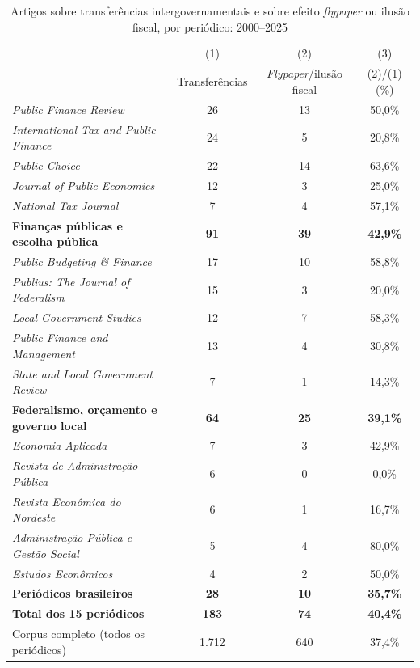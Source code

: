 \begin{table}[htbp]
\centering
\caption{Artigos sobre transferências intergovernamentais e sobre efeito \textit{flypaper} ou ilusão fiscal, por periódico: 2000--2025}
\label{tab:baker}
\small
\begin{tabular}{lccc}
\toprule
 & (1) & (2) & (3)\\
 & Transferências & \textit{Flypaper}/ilusão fiscal & (2)/(1) (\%)\\
\midrule
\textit{Public Finance Review} & 26 & 13 & 50,0\%\\
\textit{International Tax and Public Finance} & 24 & 5 & 20,8\%\\
\textit{Public Choice} & 22 & 14 & 63,6\%\\
\textit{Journal of Public Economics} & 12 & 3 & 25,0\%\\
\textit{National Tax Journal} & 7 & 4 & 57,1\%\\
\textbf{Finanças públicas e escolha pública} & \textbf{91} & \textbf{39} & \textbf{42,9\%}\\
\midrule
\textit{Public Budgeting \& Finance} & 17 & 10 & 58,8\%\\
\textit{Publius: The Journal of Federalism} & 15 & 3 & 20,0\%\\
\textit{Local Government Studies} & 12 & 7 & 58,3\%\\
\textit{Public Finance and Management} & 13 & 4 & 30,8\%\\
\textit{State and Local Government Review} & 7 & 1 & 14,3\%\\
\textbf{Federalismo, orçamento e governo local} & \textbf{64} & \textbf{25} & \textbf{39,1\%}\\
\midrule
\textit{Economia Aplicada} & 7 & 3 & 42,9\%\\
\textit{Revista de Administração Pública} & 6 & 0 & 0,0\%\\
\textit{Revista Econômica do Nordeste} & 6 & 1 & 16,7\%\\
\textit{Administração Pública e Gestão Social} & 5 & 4 & 80,0\%\\
\textit{Estudos Econômicos} & 4 & 2 & 50,0\%\\
\textbf{Periódicos brasileiros} & \textbf{28} & \textbf{10} & \textbf{35,7\%}\\
\midrule
\textbf{Total dos 15 periódicos} & \textbf{183} & \textbf{74} & \textbf{40,4\%}\\
Corpus completo (todos os periódicos) & 1.712 & 640 & 37,4\%\\
\bottomrule
\end{tabular}

\end{table}
